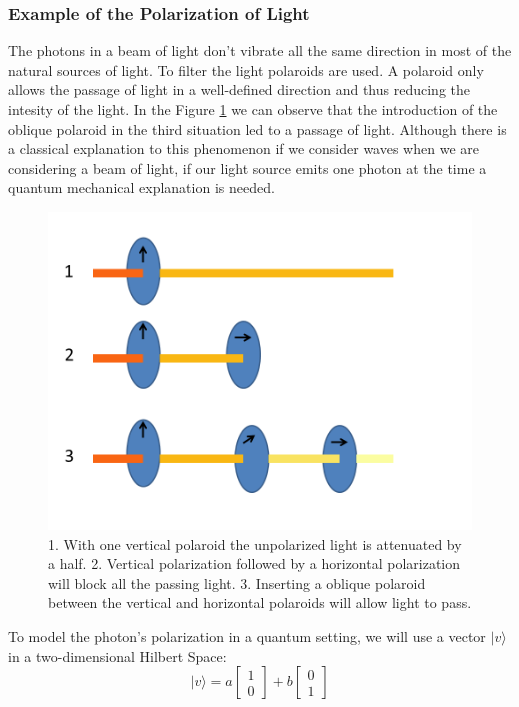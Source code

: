 \subsubsection{Example of the Polarization of Light}
The photons in a beam of light don't vibrate all the same direction in most of the natural sources of light. To filter the light polaroids are used. A polaroid only allows the passage of light in a well-defined direction and thus reducing the intesity of the light. In the Figure \ref{fig:polaroids} we can observe that the introduction of the oblique polaroid in the third situation led to a passage of light. Although there is a classical explanation to this phenomenon if we consider waves when we are considering a beam of light, if our light source emits one photon at the time a quantum mechanical explanation is needed\cite{Rieffel2011}.

\begin{figure}[h]
\centering 

\includegraphics[scale=0.25]{Overview/Figures/Polaroids.png}
\caption{1. With one vertical polaroid the unpolarized light is attenuated by a half. 2. Vertical polarization followed by a horizontal polarization will block all the passing light. 3. Inserting a oblique polaroid between the vertical and horizontal polaroids will allow light to pass.}
\label{fig:polaroids}
\end{figure}

To model the photon's polarization in a quantum setting, we will use a vector $\vert v \rangle $ in a two-dimensional Hilbert Space: 
\begin{equation}
\vert v \rangle = a\left[\begin{array}{c}
1\\
0
\end{array}\right]+ b\left[\begin{array}{c}
0\\
1
\end{array}\right]
\end{equation}

